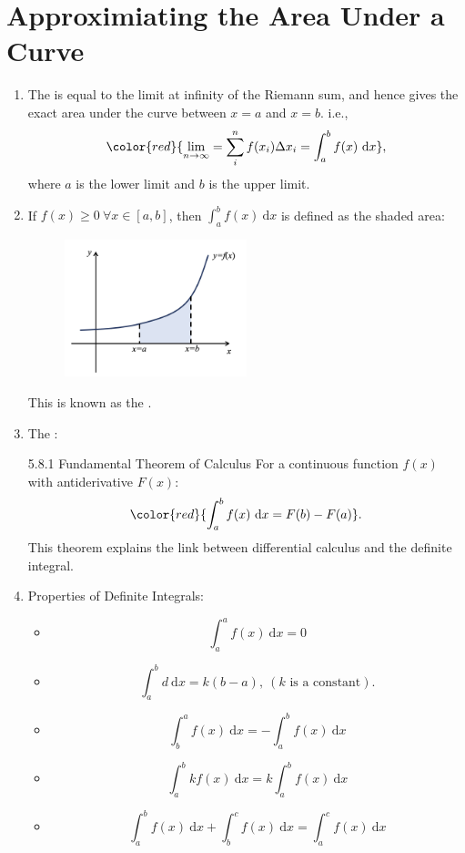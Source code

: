 \documentclass[12pt, a4paper]{article}
\def\d{{\mathrm{d}}}
\begin{document}
\section{Approximiating the Area Under a Curve}
\begin{enumerate}
    \item The {\color{red}{definite integral}} is equal to the limit at infinity of the Riemann sum, and hence gives the exact area under the curve between $x=a$ and $x=b$. i.e., 
    $${\color{red}{\lim_{n\to\infty}=\sum_{i}^{n}f(x_i)\Delta x_i=\int_a^b f(x)\ \mathrm{d}x}}, $$
    where $a$ is the lower limit and $b$ is the upper limit. 
    \item If $f(x)\geq 0\ \forall x\in\left[a,b\right]$, then $\int_a^bf(x)\ \mathrm{d}x$ is defined as the shaded area: 
    \begin{figure}[H]
        \centering 
        \includegraphics[width=0.5\textwidth]{Fig.5.6.jpg} 
    \end{figure}
    This is known as the {\color{red}{Riemann integral}}.
    \item The {\color{red}{Fundamental Theorem of Calculus}}: 
    \begin{theorem}{5.8.1 Fundamental Theorem of Calculus}{}
        For a continuous function $f(x)$ with antiderivative $F(x)$: 
        $${\color{red}{\int_a^bf(x)\ \d x=F(b)-F(a)}}.$$
        This theorem explains the link between differential calculus and the definite integral. 
    \end{theorem}
    \item Properties of Definite Integrals: 
    \begin{itemize}
        \item $$\int_a^af(x)\ \d x=0$$
        \item $$\int_a^bd\ \d x=k(b-a),\ (k\text{ is a constant}).$$
        \item $$\int_b^af(x)\ \d x=-\int_a^bf(x)\ \d x$$
        \item $$\int_a^bkf(x)\ \d x=k\int_a^bf(x)\ \d x$$
        \item $$\int_a^bf(x)\ \d x+\int_b^cf(x)\ \d x=\int_a^cf(x)\ \d x$$

\end{itemize}
\end{enumerate}
\end{document}
